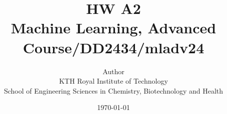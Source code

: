 \documentclass{article}
\title{HW A2\\\Large{Machine Learning, Advanced Course/DD2434/mladv24}}
\author{Author \\ KTH Royal Institute of Technology\\ School of Engineering Sciences in Chemistry, Biotechnology and Health}
\date{\today}
\begin{document}
\maketitle

\fancyfoot[C]{\thepage}
\begin{multicols}{2}

\end{multicols}

\clearpage
\end{document}
